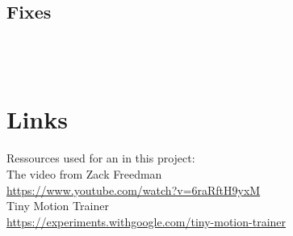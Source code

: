 \documentclass[a4paper,titlepage]{article}
\begin{document}
\subsection{Fixes}

\begin{lstlisting}
\end{lstlisting}

\begin{lstlisting}
\end{lstlisting}

\begin{lstlisting}
\end{lstlisting}

\begin{lstlisting}
\end{lstlisting}

\newpage
\section{Links}

Ressources used for an in this project: \\

The video from Zack Freedman \\
\href{https://www.youtube.com/watch?v=6raRftH9yxM}{https://www.youtube.com/watch?v=6raRftH9yxM} \\

Tiny Motion Trainer \\
\href{https://experiments.withgoogle.com/tiny-motion-trainer}{https://experiments.withgoogle.com/tiny-motion-trainer} \\
\end{document}
